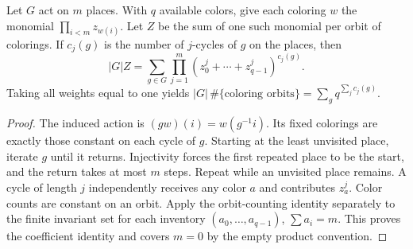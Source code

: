 \begin{theorem}\label{result64}
Let $G$ act on $m$ places. With $q$ available colors, give each coloring
$w$ the monomial $\prod_{i<m} z_{w(i)}$. Let $Z$ be the sum of one such
monomial per orbit of colorings. If $c_j(g)$ is the number of $j$-cycles
of $g$ on the places, then
\[
 |G| Z=\sum_{g\in G}\prod_{j=1}^{m}
          (z_0^j+\cdots+z_{q-1}^j)^{c_j(g)}.
\]
Taking all weights equal to one yields
$|G|\,\#\{\text{coloring orbits}\}=\sum_g q^{\sum_j c_j(g)}$.
\end{theorem}
\begin{proof}
The induced action is $(gw)(i)=w(g^{-1}i)$. Its fixed colorings are
exactly those constant on each cycle of $g$. Starting at the least
unvisited place, iterate $g$ until it returns. Injectivity forces the
first repeated place to be the start, and the return takes at most $m$
steps. Repeat while an unvisited place remains. A cycle of length $j$
independently receives any color $a$ and contributes $z_a^j$.
Color counts are constant on an orbit. Apply the orbit-counting
identity separately to the finite invariant set for each inventory
$(a_0,\ldots,a_{q-1})$, $\sum a_i=m$. This proves the coefficient
identity and covers $m=0$ by the empty product convention.
\end{proof}

